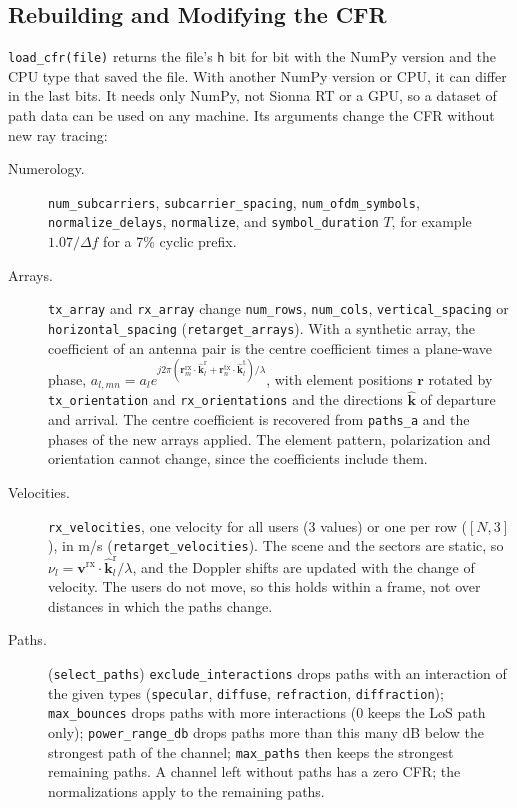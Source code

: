 \documentclass{article}
\begin{document}
\subsection{Rebuilding and Modifying the CFR}
\texttt{load\_cfr(file)} returns the file's \texttt{h} bit for bit with the NumPy version and the CPU type that saved the file. With another NumPy version or CPU, it can differ in the last bits. It needs only NumPy, not Sionna RT or a GPU, so a dataset of path data can be used on any machine. Its arguments change the CFR without new ray tracing:
\begin{description}
  \item[Numerology.] \texttt{num\_subcarriers}, \texttt{subcarrier\_spacing}, \texttt{num\_ofdm\_symbols}, \texttt{normalize\_delays}, \texttt{normalize}, and \texttt{symbol\_duration} $T$, for example $1.07/\Delta f$ for a 7\% cyclic prefix.
  \item[Arrays.] \texttt{tx\_array} and \texttt{rx\_array} change \texttt{num\_rows}, \texttt{num\_cols}, \texttt{vertical\_spacing} or \texttt{horizontal\_spacing} (\texttt{retarget\_arrays}). With a synthetic array, the coefficient of an antenna pair is the centre coefficient times a plane-wave phase, $a_{l,mn} = a_l e^{j 2\pi (\mathbf{r}^\mathrm{rx}_m \cdot \hat{\mathbf{k}}^\mathrm{r}_l + \mathbf{r}^\mathrm{tx}_n \cdot \hat{\mathbf{k}}^\mathrm{t}_l)/\lambda}$, with element positions $\mathbf{r}$ rotated by \texttt{tx\_orientation} and \texttt{rx\_orientations} and the directions $\hat{\mathbf{k}}$ of departure and arrival. The centre coefficient is recovered from \texttt{paths\_a} and the phases of the new arrays applied. The element pattern, polarization and orientation cannot change, since the coefficients include them.
  \item[Velocities.] \texttt{rx\_velocities}, one velocity for all users (3 values) or one per row ($[N, 3]$), in m/s (\texttt{retarget\_velocities}). The scene and the sectors are static, so $\nu_l = \mathbf{v}^\mathrm{rx} \cdot \hat{\mathbf{k}}^\mathrm{r}_l / \lambda$, and the Doppler shifts are updated with the change of velocity. The users do not move, so this holds within a frame, not over distances in which the paths change.
  \item[Paths.] (\texttt{select\_paths}) \texttt{exclude\_interactions} drops paths with an interaction of the given types (\texttt{specular}, \texttt{diffuse}, \texttt{refraction}, \texttt{diffraction}); \texttt{max\_bounces} drops paths with more interactions (0 keeps the LoS path only); \texttt{power\_range\_db} drops paths more than this many dB below the strongest path of the channel; \texttt{max\_paths} then keeps the strongest remaining paths. A channel left without paths has a zero CFR; the normalizations apply to the remaining paths.
\end{description}
\end{document}
